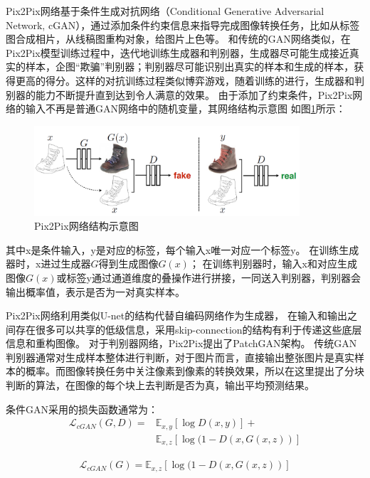 Pix2Pix网络基于条件生成对抗网络（Conditional Generative Adversarial Network, cGAN）\cite{cGAN}，通过添加条件约束信息来指导完成图像转换任务，比如从标签图合成相片，从线稿图重构对象，给图片上色等。
和传统的GAN网络类似，在Pix2Pix模型训练过程中，迭代地训练生成器和判别器，生成器尽可能生成接近真实的样本，企图“欺骗”判别器；判别器尽可能识别出真实的样本和生成的样本，获得更高的得分。这样的对抗训练过程类似博弈游戏，随着训练的进行，生成器和判别器的能力不断提升直到达到令人满意的效果。
由于添加了约束条件，Pix2Pix网络的输入不再是普通GAN网络中的随机变量，其网络结构示意图
如图\ref{fig:cgan}所示：

\begin{figure}[htp]
	\centering
	\includegraphics[width=0.88\textwidth]{figures/cGAN.png}
	\caption{Pix2Pix网络结构示意图}
	\label{fig:cgan}
\end{figure}

其中x是条件输入，y是对应的标签，每个输入x唯一对应一个标签y。
在训练生成器时，x进过生成器$G$得到生成图像$G(x)$；
在训练判别器时，输入x和对应生成图像$G(x)$或标签y通过通道维度的叠操作进行拼接，一同送入判别器，判别器会输出概率值，表示是否为一对真实样本。



Pix2Pix网络利用类似U-net的结构代替自编码网络作为生成器，
在输入和输出之间存在很多可以共享的低级信息，采用skip-connection的结构有利于传递这些底层信息和重构图像。
对于判别器网络，Pix2Pix提出了PatchGAN架构。
传统GAN判别器通常对生成样本整体进行判断，对于图片而言，直接输出整张图片是真实样本的概率。而图像转换任务中关注像素到像素的转换效果，所以在这里提出了分块判断的算法，在图像的每个块上去判断是否为真，输出平均预测结果。


条件GAN采用的损失函数通常为：
\begin{equation}
\begin{aligned}
\mathcal{L}_{c G A N}(G, D)= &\mathbb{E}_{x,y}[\log D(x,y)]+\\
&\mathbb{E}_{x,z }[\log (1-D(x, G(x,z))]
\end{aligned}
\end{equation}

\begin{equation}
\begin{aligned}
\mathcal{L}_{c G A N}(G)= \mathbb{E}_{x,z}[\log (1-D(x, G(x, z))]
\end{aligned}
\end{equation}

